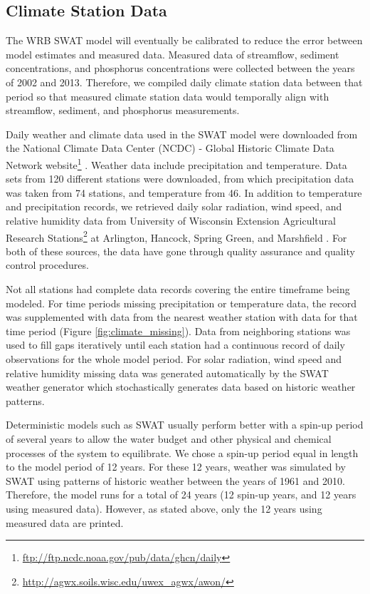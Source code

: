 \subsection{Climate Station Data}\label{sec:climate_data}

The WRB SWAT model will eventually be calibrated to reduce the error between model estimates and measured data. Measured data of streamflow, sediment concentrations, and phosphorus concentrations were collected between the years of 2002 and 2013. Therefore, we compiled daily climate station data between that period so that measured climate station data would temporally align with streamflow, sediment, and phosphorus measurements.

Daily weather and climate data used in the SWAT model were downloaded from the National Climate Data Center (NCDC) - Global Historic Climate Data Network website\footnote{\url{ftp://ftp.ncdc.noaa.gov/pub/data/ghcn/daily}} \citep{ncdc_ghcn_2012}. 
Weather data include precipitation and temperature.  
Data sets from 120 different stations were downloaded, from which precipitation data was taken from 74 stations, and temperature from 46. 
In addition to temperature and precipitation records, we retrieved daily solar radiation, wind speed, and relative humidity data from University of Wisconsin Extension Agricultural Research Stations\footnote{\url{http://agwx.soils.wisc.edu/uwex_agwx/awon/}} at Arlington, Hancock, Spring Green, and Marshfield . 
For both of these sources, the data have gone through quality assurance and quality control procedures.

Not all stations had complete data records covering the entire timeframe being modeled.  For time periods missing precipitation or temperature data, the record was supplemented with data from the nearest weather station with data for that time period (Figure \ref{fig:climate_missing}). Data from neighboring stations was used to fill gaps iteratively until each station had a continuous record of daily observations for the whole model period. For solar radiation, wind speed and relative humidity missing data was generated automatically by the SWAT weather generator which stochastically generates data based on historic weather patterns.

Deterministic models such as SWAT usually perform better with a spin-up period of several years to allow the water budget and other physical and chemical processes of the system to equilibrate. We chose a spin-up period equal in length to the model period of 12 years. For these 12 years, weather was simulated by SWAT using patterns of historic weather between the years of 1961 and 2010. Therefore, the model runs for a total of 24 years (12 spin-up years, and 12 years using measured data). However, as stated above, only the 12 years using measured data are printed.
